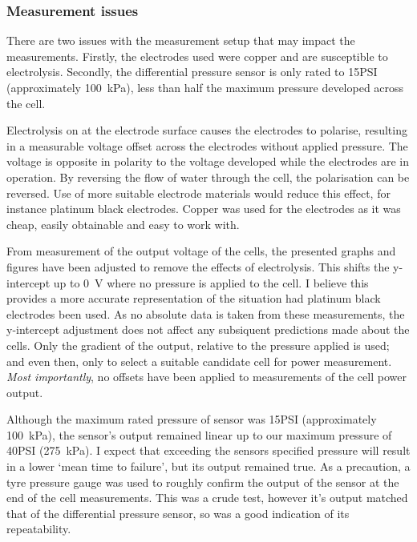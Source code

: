     \subsubsection*{Measurement issues}

    There are two issues with the measurement setup that may impact the measurements.
    Firstly, the electrodes used were copper and are susceptible to electrolysis.
    Secondly, the differential pressure sensor is only rated to 15\thinspace PSI (approximately \SI{100}{\kilo\pascal}), less than half the maximum pressure developed across the cell.

    Electrolysis on at the electrode surface causes the electrodes to polarise, resulting in a measurable voltage offset across the electrodes without applied pressure.
    The voltage is opposite in polarity to the voltage developed while the electrodes are in operation.
    By reversing the flow of water through the cell, the polarisation can be reversed.
    Use of more suitable electrode materials would reduce this effect, for instance platinum black electrodes.
    Copper was used for the electrodes as it was cheap, easily obtainable and easy to work with.

    From measurement of the output voltage of the cells, the presented graphs and figures have been adjusted to remove the effects of electrolysis.
    This shifts the y-intercept up to \SI{0}{\volt} where no pressure is applied to the cell.
    I believe this provides a more accurate representation of the situation had platinum black electrodes been used.
    As no absolute data is taken from these measurements, the y-intercept adjustment does not affect any subsiquent predictions made about the cells.
    Only the gradient of the output, relative to the pressure applied is used; and even then, only to select a suitable candidate cell for power measurement.
    \emph{Most importantly}, no offsets have been applied to measurements of the cell power output.

    Although the maximum rated pressure of sensor was 15\thinspace PSI (approximately \SI{100}{\kilo\pascal}), the sensor's output remained linear up to our maximum pressure of 40\thinspace PSI (\SI{275}{\kilo\pascal}).
    I expect that exceeding the sensors specified pressure will result in a lower `mean time to failure', but its output remained true.
    As a precaution, a tyre pressure gauge was used to roughly confirm the output of the sensor at the end of the cell measurements.
    This was a crude test, however it's output matched that of the differential pressure sensor, so was a good indication of its repeatability.


